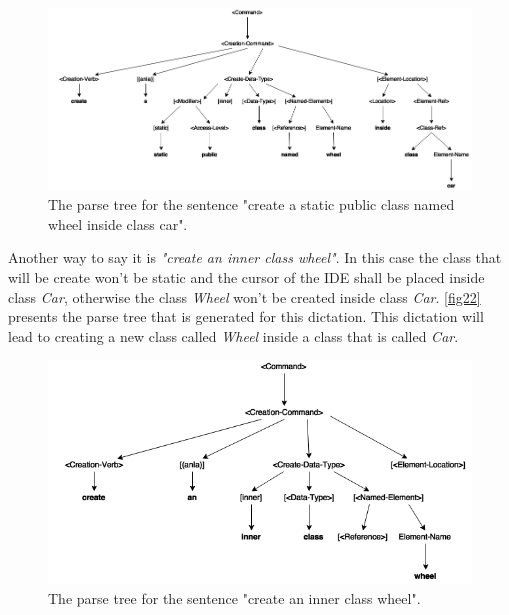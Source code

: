 \begin{figure}[H]
\centering
\includegraphics[scale=0.4]{"./fig/Parse Tree create a static public class named wheel inside class car"}
\caption{The parse tree for the sentence "create a static public class named wheel inside class car".}
\label{fig21}
\end{figure}

Another way to say it is \textit{"create an inner class wheel"}. In this case the class that will be create won't be static and the cursor of the IDE shall be placed inside class \textit{Car}, otherwise the class \textit{Wheel} won't be created inside class \textit{Car}. \autoref{fig22} presents the parse tree that is generated for this dictation. This dictation will lead to creating a new class called \textit{Wheel} inside a class that is called \textit{Car}.

\begin{figure}[H]
\centering
\includegraphics[scale=0.4]{"./fig/Parse Tree create an inner class wheel"}
\caption{The parse tree for the sentence "create an inner class wheel".}
\label{fig22}
\end{figure}

